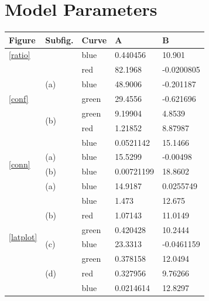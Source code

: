 \documentclass[a4paper,12pt,twoside]{report}
\begin{document}
\chapter{Model Parameters} \label{modelparams}
\begin{table}[ht]
\centering
\begin{tabular}{|l|l|l|l|l|}
\hline
Figure & Subfig. & Curve & A & B \\ \hline
\ref{ratio}					&					   & blue & 0.440456 & 10.901 \\ \hline
\multirow{5}{*}{\ref{conf}} & \multirow{3}{*}{(a)} & red & 82.1968 & -0.0200805 \\
 							& 					   & blue & 48.9006 & -0.201187 \\
 							& 					   & green & 29.4556 & -0.621696 \\ \cline{2-5}	
 							& \multirow{2}{*}{(b)} & green & 9.19904 & 4.8539 \\
 							&					   & red & 1.21852 & 8.87987 \\
 							& 					   & blue & 0.0521142 & 15.1466 \\ \hline
\multirow{2}{*}{\ref{conn}} & (a) & blue & 15.5299 & -0.00498 \\ \cline{2-5}	
 							& (b) & blue & 0.00721199 & 18.8602 \\ \hline
\multirow{8}{*}{\ref{latplot}} & (a)				   & blue & 14.9187 & 0.0255749 \\ \cline{2-5}	
 							& \multirow{3}{*}{(b)} & blue & 1.473 & 12.675 \\
 							& 					   & red & 1.07143 & 11.0149 \\ 
 							& 					   & green & 0.420428 & 10.2444 \\ \cline{2-5}	
							& (c)				   & blue & 23.3313 & -0.0461159 \\ \cline{2-5}	
 							& \multirow{3}{*}{(d)} & green & 0.378158 & 12.0494 \\
 							& 					   & red & 0.327956 & 9.76266 \\ 
 							& 					   & blue & 0.0214614 & 12.8297 \\ \hline
\end{tabular}
\end{table}
\end{document}
